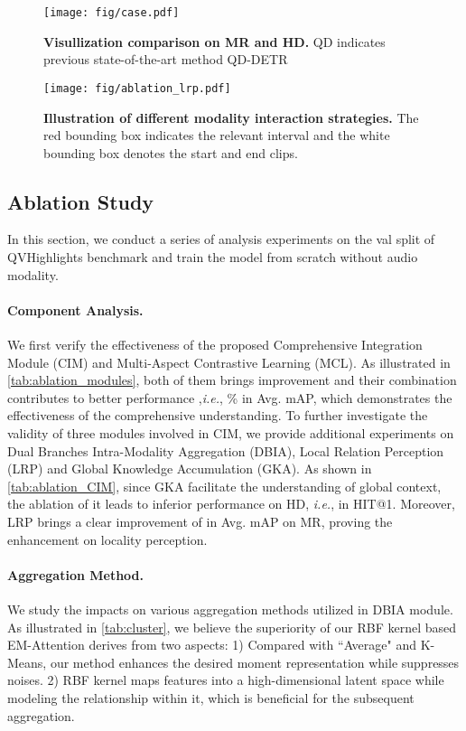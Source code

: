 \documentclass[10pt,twocolumn,letterpaper]{article}
\begin{document}
\begin{figure*}[h]
\vspace{3mm}
    \centering
    \texttt{[image: fig/case.pdf]}
    \caption{\textbf{Visullization comparison on MR and HD.} QD indicates previous state-of-the-art method QD-DETR~\cite{qddetr}}
    \label{fig:case_show}
    \vspace{-10pt}
\end{figure*}
\begin{figure}
    \centering
    \texttt{[image: fig/ablation\_lrp.pdf]}
    \caption{\textbf{Illustration of different modality interaction strategies.}
    The red bounding box indicates the relevant interval and the white bounding box denotes the start and end clips.}
    \label{fig:ablation-lrp}
    \vspace{-15pt}
\end{figure}


\subsection{Ablation Study}
In this section, we conduct a series of analysis experiments on the val split of QVHighlights benchmark and train the model from scratch without audio modality.

\paragraph{Component Analysis.}
We first verify the effectiveness of the proposed Comprehensive Integration Module (CIM) and Multi-Aspect Contrastive Learning (MCL).
As illustrated in \cref{tab:ablation_modules}, both of them brings improvement and their combination contributes to better performance ,\textit{i.e.}, \% in Avg. mAP, which demonstrates the effectiveness of the comprehensive understanding.
To further investigate the validity of three modules involved in CIM, we provide additional experiments on Dual Branches Intra-Modality Aggregation (DBIA), Local Relation Perception (LRP) and Global Knowledge Accumulation (GKA).  
As shown in \cref{tab:ablation_CIM}, since GKA facilitate the understanding of global context, the ablation of it leads to inferior performance on HD, \textit{i.e.},  in HIT@1. Moreover, LRP brings a clear improvement of  in Avg. mAP on MR, proving the enhancement on locality perception.  

\vspace{-12pt}
\paragraph{Aggregation Method.}
We study the impacts on various aggregation methods utilized in DBIA module.
As illustrated in \cref{tab:cluster}, we believe the superiority of our RBF kernel based EM-Attention derives from two aspects: 1) Compared with ``Average" and K-Means, our method
enhances the desired moment representation while suppresses noises.
2) RBF kernel maps features into a high-dimensional latent space while modeling the relationship within it, which is beneficial for the subsequent aggregation.
\end{document}
